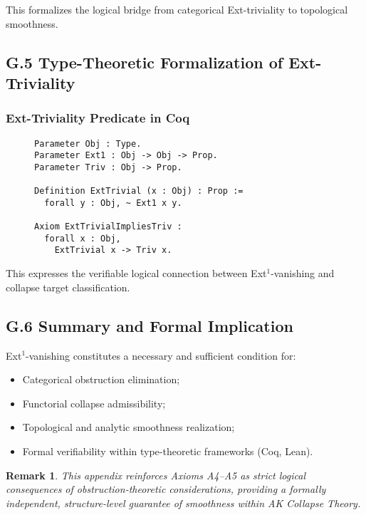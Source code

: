 \documentclass[11pt]{article}
\newtheorem{remark}[theorem]{Remark}
\begin{document}
This formalizes the logical bridge from categorical Ext-triviality to topological smoothness.

\subsection*{G.5 Type-Theoretic Formalization of Ext-Triviality}

\subsubsection*{Ext-Triviality Predicate in Coq}

\begin{figure}[h]
\centering
\begin{lstlisting}[language=Coq, caption=Ext-Triviality and Collapse Formalization]
Parameter Obj : Type.
Parameter Ext1 : Obj -> Obj -> Prop.
Parameter Triv : Obj -> Prop.

Definition ExtTrivial (x : Obj) : Prop :=
  forall y : Obj, ~ Ext1 x y.

Axiom ExtTrivialImpliesTriv :
  forall x : Obj,
    ExtTrivial x -> Triv x.
\end{lstlisting}
\end{figure}

This expresses the verifiable logical connection between Ext$^1$-vanishing and collapse target classification.

\subsection*{G.6 Summary and Formal Implication}

Ext$^1$-vanishing constitutes a necessary and sufficient condition for:

\begin{itemize}
    \item Categorical obstruction elimination;
    \item Functorial collapse admissibility;
    \item Topological and analytic smoothness realization;
    \item Formal verifiability within type-theoretic frameworks (Coq, Lean).
\end{itemize}

\begin{remark}
This appendix reinforces Axioms A4–A5 as strict logical consequences of obstruction-theoretic considerations, providing a formally independent, structure-level guarantee of smoothness within AK Collapse Theory.
\end{remark}
\end{document}
